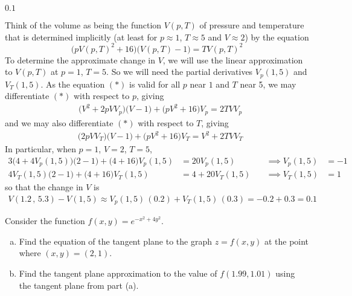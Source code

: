 %

\begin{answer}
$0.1$
\end{answer}

\begin{solution}
Think of the volume as being the function $V(p,T)$ of pressure and temperature
that is determined implicitly (at least for $p\approx 1$, $T\approx 5$ and $V\approx 2$) by the equation
\begin{equation*}
\big(pV(p,T)^2 + 16\big)\big(V(p,T) - 1\big) = T V(p,T)^2 
\tag{$*$}\end{equation*}
To determine the approximate change in $V$, we will use the linear
approximation to $V(p,T)$ at $p=1$, $T=5$. So we will need the
partial derivatives $V_p(1,5)$ and $V_T(1,5)$. As the equation $(*)$
is valid for all $p$ near $1$ and $T$ near 5, we may differentiate $(*)$
with respect to $p$, giving
\begin{align*}
&\big(V^2 +2 pV V_p\big)\big(V - 1\big) 
+ \big(pV ^2 + 16\big)V_p = 2T V V_p 
\end{align*}
and we may also differentiate $(*)$ with respect to $T$, giving
\begin{align*}
&\big(2 pV V_T\big)\big(V - 1\big) + \big(pV ^2 + 16\big)V_T = V^2 + 2T V V_T
\end{align*}
In particular, when $p=1$, $V=2$, $T=5$,
\begin{alignat*}{3}
\big(4 +4 V_p(1,5)\big)\big(2 - 1\big) 
+ \big(4 + 16\big)V_p(1,5) &= 20 V_p(1,5) 
&\quad\implies
V_p(1,5)&=-1 \\
4 V_T(1,5)\big(2 - 1\big) + \big(4 + 16\big)V_T(1,5) &= 4 + 20 V_T(1,5)
&\quad\implies
V_T(1,5)&=1
\end{alignat*}
so that the change in $V$ is
\begin{align*}
V(1.2\,,\,5.3)-V(1,5) \approx  V_p(1,5)\,(0.2) + V_T(1,5)\,(0.3)
                        = -0.2+0.3
                        = 0.1
\end{align*}
\end{solution}

\begin{question}[M200 2011D] %
Consider the function $f(x, y) = e^{-x^2 +4y^2}$.
\begin{enumerate}[(a)]
\item
Find the equation of the tangent plane to the graph $z = f (x,y)$ at the 
point where $(x, y) = (2, 1)$.
\item
Find the tangent plane approximation to the value of $f(1.99, 1.01)$ using the
tangent plane from part (a).
\end{enumerate}
\end{question}

